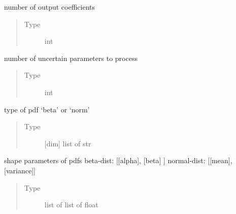 \documentclass[letterpaper,10pt,english,openany,oneside]{sphinxmanual}
\begin{document}
\begin{fulllineitems}
\begin{fulllineitems}
\label{\detokenize{pygpc:pygpc.gpc.gPC.N_out}}
number of output coefficients
\begin{quote}\begin{description}
\item[{Type}] \leavevmode
int

\end{description}\end{quote}

\end{fulllineitems}


\begin{fulllineitems}
\label{\detokenize{pygpc:pygpc.gpc.gPC.dim}}
number of uncertain parameters to process
\begin{quote}\begin{description}
\item[{Type}] \leavevmode
int

\end{description}\end{quote}

\end{fulllineitems}


\begin{fulllineitems}
\label{\detokenize{pygpc:pygpc.gpc.gPC.pdf_type}}
type of pdf ‘beta’ or ‘norm’
\begin{quote}\begin{description}
\item[{Type}] \leavevmode
{[}dim{]} list of str

\end{description}\end{quote}

\end{fulllineitems}


\begin{fulllineitems}
\label{\detokenize{pygpc:pygpc.gpc.gPC.pdf_shape}}
shape parameters of pdfs
beta-dist:   {[}{[}alpha{]}, {[}beta{]}    {]}
normal-dist: {[}{[}mean{]},  {[}variance{]}{]}
\begin{quote}\begin{description}
\item[{Type}] \leavevmode
list of list of float


\end{description}
\end{quote}
\end{fulllineitems}
\end{fulllineitems}
\end{document}
